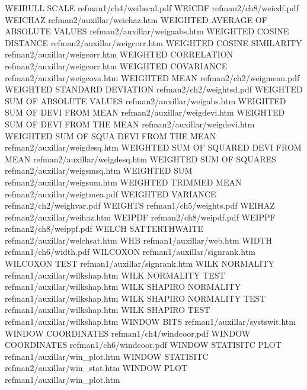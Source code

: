 WEIBULL SCALE                           refman1/ch4/weibscal.pdf
WEICDF                                  refman2/ch8/weicdf.pdf
WEICHAZ                                 refman2/auxillar/weichaz.htm
WEIGHTED AVERAGE OF ABSOLUTE VALUES     refman2/auxillar/weigaabs.htm
WEIGHTED COSINE DISTANCE                refman2/auxillar/weigcorr.htm
WEIGHTED COSINE SIMILARITY              refman2/auxillar/weigcorr.htm
WEIGHTED CORRELATION                    refman2/auxillar/weigcorr.htm
WEIGHTED COVARIANCE                     refman2/auxillar/weigcova.htm
WEIGHTED MEAN                           refman2/ch2/weigmean.pdf
WEIGHTED STANDARD DEVIATION             refman2/ch2/weightsd.pdf
WEIGHTED SUM OF ABSOLUTE VALUES         refman2/auxillar/weigabs.htm
WEIGHTED SUM OF DEVI FROM MEAN          refman2/auxillar/weigdevi.htm
WEIGHTED SUM OF DEVI FROM THE MEAN      refman2/auxillar/weigdevi.htm
WEIGHTED SUM OF SQUA DEVI FROM THE MEAN refman2/auxillar/weigdesq.htm
WEIGHTED SUM OF SQUARED DEVI FROM MEAN  refman2/auxillar/weigdesq.htm
WEIGHTED SUM OF SQUARES                 refman2/auxillar/weigsmsq.htm
WEIGHTED SUM                            refman2/auxillar/weigsum.htm
WEIGHTED TRIMMED MEAN                   refman2/auxillar/weigtmea.pdf
WEIGHTED VARIANCE                       refman2/ch2/weighvar.pdf
WEIGHTS                                 refman1/ch5/weights.pdf
WEIHAZ                                  refman2/auxillar/weihaz.htm
WEIPDF                                  refman2/ch8/weipdf.pdf
WEIPPF                                  refman2/ch8/weippf.pdf
WELCH SATTERTHWAITE                     refman2/auxillar/welchsat.htm
WHB                                     refman1/auxillar/web.htm
WIDTH                                   refman1/ch6/width.pdf
WILCOXON                                refman1/auxillar/signrank.htm
WILCOXON TEST                           refman1/auxillar/signrank.htm
WILK NORMALITY                          refman1/auxillar/wilkshap.htm
WILK NORMALITY TEST                     refman1/auxillar/wilkshap.htm
WILK SHAPIRO NORMALITY                  refman1/auxillar/wilkshap.htm
WILK SHAPIRO NORMALITY TEST             refman1/auxillar/wilkshap.htm
WILK SHAPIRO TEST                       refman1/auxillar/wilkshap.htm
WINDOW BITS                             refman1/auxillar/systswit.htm
WINDOW COORDINATES                      refman1/ch4/windcoor.pdf
WINDOW COORDINATES                      refman1/ch6/windcoor.pdf
WINDOW STATISITC PLOT                   refman1/auxillar/win_plot.htm
WINDOW STATISITC                        refman2/auxillar/win_stat.htm
WINDOW PLOT                             refman1/auxillar/win_plot.htm
